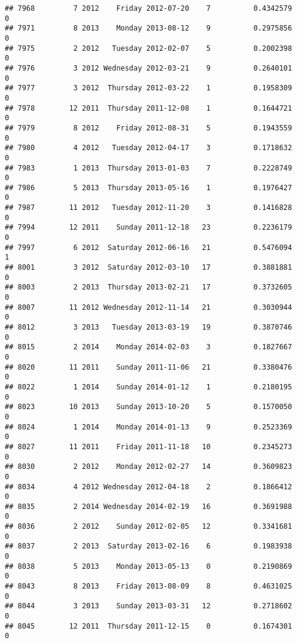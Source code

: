 \documentclass[
]{article}
\begin{document}
\begin{verbatim}
## 7968         7 2012    Friday 2012-07-20    7          0.4342579             0
## 7971         8 2013    Monday 2013-08-12    9          0.2975856             0
## 7975         2 2012   Tuesday 2012-02-07    5          0.2002398             0
## 7976         3 2012 Wednesday 2012-03-21    9          0.2640101             0
## 7977         3 2012  Thursday 2012-03-22    1          0.1958309             0
## 7978        12 2011  Thursday 2011-12-08    1          0.1644721             0
## 7979         8 2012    Friday 2012-08-31    5          0.1943559             0
## 7980         4 2012   Tuesday 2012-04-17    3          0.1718632             0
## 7983         1 2013  Thursday 2013-01-03    7          0.2228749             0
## 7986         5 2013  Thursday 2013-05-16    1          0.1976427             0
## 7987        11 2012   Tuesday 2012-11-20    3          0.1416828             0
## 7994        12 2011    Sunday 2011-12-18   23          0.2236179             0
## 7997         6 2012  Saturday 2012-06-16   21          0.5476094             1
## 8001         3 2012  Saturday 2012-03-10   17          0.3881881             0
## 8003         2 2013  Thursday 2013-02-21   17          0.3732605             0
## 8007        11 2012 Wednesday 2012-11-14   21          0.3030944             0
## 8012         3 2013   Tuesday 2013-03-19   19          0.3870746             0
## 8015         2 2014    Monday 2014-02-03    3          0.1827667             0
## 8020        11 2011    Sunday 2011-11-06   21          0.3380476             0
## 8022         1 2014    Sunday 2014-01-12    1          0.2180195             0
## 8023        10 2013    Sunday 2013-10-20    5          0.1570050             0
## 8024         1 2014    Monday 2014-01-13    9          0.2523369             0
## 8027        11 2011    Friday 2011-11-18   10          0.2345273             0
## 8030         2 2012    Monday 2012-02-27   14          0.3609823             0
## 8034         4 2012 Wednesday 2012-04-18    2          0.1866412             0
## 8035         2 2014 Wednesday 2014-02-19   16          0.3691988             0
## 8036         2 2012    Sunday 2012-02-05   12          0.3341681             0
## 8037         2 2013  Saturday 2013-02-16    6          0.1983938             0
## 8038         5 2013    Monday 2013-05-13    0          0.2190869             0
## 8043         8 2013    Friday 2013-08-09    8          0.4631025             0
## 8044         3 2013    Sunday 2013-03-31   12          0.2718602             0
## 8045        12 2011  Thursday 2011-12-15    0          0.1674301             0

\end{verbatim}
\end{document}
